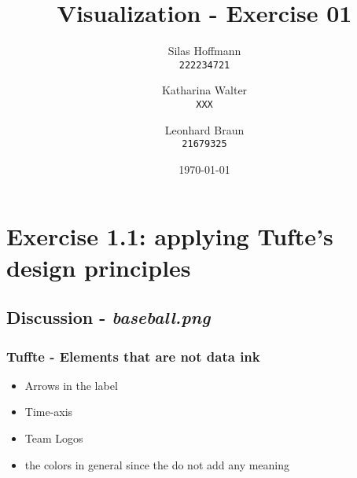 \documentclass[a4paper]{article}
\title{Visualization - Exercise 01}
\author{
    Silas Hoffmann \\
    \texttt{222234721}
    \and
    Katharina Walter \\
    \texttt{XXX}
    \and
    Leonhard Braun \\
    \texttt{21679325}
}
\date{\today}
\begin{document}
    \maketitle


    \section{Exercise 1.1: applying Tufte's design principles}

    \subsection{Discussion - \textit{baseball.png}}

    \subsubsection{Tuffte - Elements that are not \textbf{data ink}}
    \begin{itemize}
        \item Arrows in the label
        \item Time-axis
        \item Team Logos
        \item the colors in general since the do not add any meaning
    \end{itemize}
\end{document}
